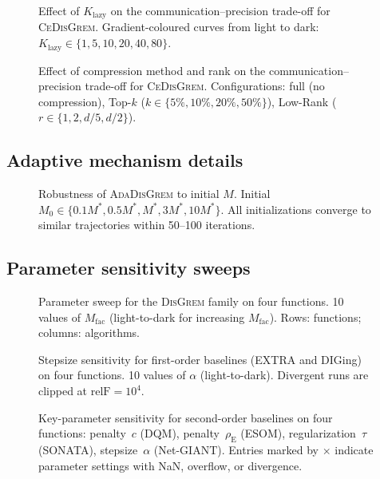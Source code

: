 \documentclass[review,onefignum,onetabnum]{siamart171218}
\begin{document}
	\begin{figure}[htbp]
		\centering
		\caption{Effect of $K_{\mathrm{lazy}}$ on the
			communication--precision trade-off for \textsc{CeDisGrem}.
			Gradient-coloured curves from light to dark:
			$K_{\mathrm{lazy}}\in\{1,5,10,20,40,80\}$.}
		\label{fig:klazy}
	\end{figure}
	
	\begin{figure}[htbp]
		\centering
		\caption{Effect of compression method and rank on the
			communication--precision trade-off for \textsc{CeDisGrem}.
			Configurations: full (no compression),
			Top-$k$ ($k\in\{5\%,10\%,20\%,50\%\}$),
			Low-Rank ($r\in\{1,2,d/5,d/2\}$).}
		\label{fig:compress}
	\end{figure}
	
	\subsection{Adaptive mechanism details}
	
	\begin{figure}[htbp]
		\centering
		\caption{Robustness of \textsc{AdaDisGrem} to initial $M$.
			Initial $M_0\in\{0.1M^*,0.5M^*,M^*,3M^*,10M^*\}$.
			All initializations converge to similar trajectories within
			50--100 iterations.}
		\label{fig:ada_init_m}
	\end{figure}
	
	\subsection{Parameter sensitivity sweeps}
	
	\begin{figure}[htbp]
		\centering
		\caption{Parameter sweep for the \textsc{DisGrem} family
			on four functions.
			10 values of $M_{\mathrm{fac}}$ (light-to-dark for increasing
			$M_{\mathrm{fac}}$).
			Rows: functions; columns: algorithms.}
		\label{fig:sweep_disgrem}
	\end{figure}
	
	\begin{figure}[htbp]
		\centering
		\caption{Stepsize sensitivity for first-order baselines
			(EXTRA and DIGing) on four functions.
			10 values of $\alpha$ (light-to-dark).
			Divergent runs are clipped at $\mathrm{relF}=10^4$.}
		\label{fig:sweep_first}
	\end{figure}
	
	\begin{figure}[htbp]
		\centering
		\caption{Key-parameter sensitivity for second-order baselines
			on four functions: penalty~$c$ (DQM), penalty~$\rho_{\mathrm{E}}$ (ESOM),
			regularization~$\tau$ (SONATA), stepsize~$\alpha$ (Net-GIANT).
			Entries marked by $\times$ indicate parameter settings with
			NaN, overflow, or divergence.}
		\label{fig:sweep_second}
	\end{figure}
	
\end{document}
